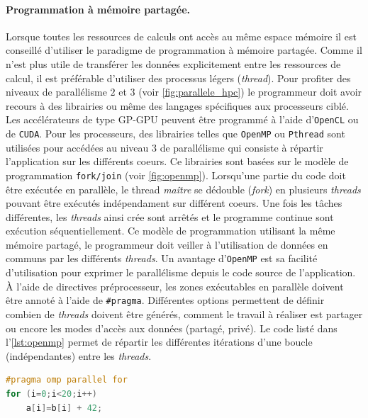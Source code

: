            
           
            \paragraph{Programmation à mémoire partagée.} Lorsque toutes les ressources de calculs ont accès au même espace mémoire il est conseillé d'utiliser le paradigme de programmation à mémoire partagée. Comme il n'est plus utile de transférer les données explicitement entre les ressources de calcul, il est préférable d'utiliser des processus légers (\textit{thread}). Pour profiter des niveaux de parallélisme $2$ et $3$ (voir \autoref{fig:parallele_hpc}) le programmeur doit avoir recours à des librairies ou même des langages spécifiques aux processeurs ciblé. Les accélérateurs de type GP-GPU peuvent être programmé à l'aide d'\verb|OpenCL| ou de \verb|CUDA|. Pour les processeurs, des librairies telles que \verb|OpenMP| ou \verb|Pthread| sont utilisées pour accédées au niveau $3$ de parallélisme qui consiste à répartir l'application sur les différents coeurs. Ce librairies sont basées sur le modèle de programmation \verb|fork/join| (voir \autoref{fig:openmp}). Lorsqu'une partie du code doit être exécutée en parallèle, le thread \textit{maître} se dédouble (\textit{fork}) en plusieurs \textit{threads} pouvant être exécutés indépendament sur différent coeurs. Une fois les tâches différentes, les \textit{threads} ainsi crée sont arrêtés et le programme continue sont exécution séquentiellement. Ce modèle de programmation utilisant la même mémoire partagé, le programmeur doit veiller à l'utilisation de données en communs par les différents \textit{threads}. Un avantage d'\verb|OpenMP| est sa facilité d'utilisation pour exprimer le parallélisme depuis le code source de l'application. À l'aide de directives préprocesseur, les zones exécutables en parallèle doivent être annoté à l'aide de \verb|#pragma|. Différentes options permettent de définir combien de \textit{threads} doivent être générés, comment le travail à réaliser est partager ou encore les modes d'accès aux données (partagé, privé).
            Le code listé dans l'\autoref{lst:openmp} permet de répartir les différentes itérations d'une boucle (indépendantes) entre les \textit{threads}.
            
\begin{lstlisting}[language=C, caption=Implémentions de l'algorithme de calcul d'intégrale par la méthode des rectangles, float,floatplacement=H, label=lst:openmp]
#pragma omp parallel for
for (i=0;i<20;i++)
    a[i]=b[i] + 42;
\end{lstlisting}

